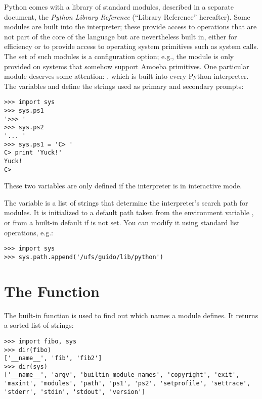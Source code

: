 \documentclass{manual}
\begin{document}
Python comes with a library of standard modules, described in a separate
document, the \emph{Python Library Reference} (``Library Reference''
hereafter).  Some modules are built into the interpreter; these
provide access to operations that are not part of the core of the
language but are nevertheless built in, either for efficiency or to
provide access to operating system primitives such as system calls.
The set of such modules is a configuration option; e.g., the
 module is  only provided on systems that somehow
support Amoeba primitives.  One particular module deserves some
attention: , which is built into every
Python interpreter.  The variables  and
 define the strings used as primary and secondary
prompts:

\begin{verbatim}
>>> import sys
>>> sys.ps1
'>>> '
>>> sys.ps2
'... '
>>> sys.ps1 = 'C> '
C> print 'Yuck!'
Yuck!
C> 
\end{verbatim}

These two variables are only defined if the interpreter is in
interactive mode.

The variable  is a list of strings that determine the
interpreter's search path for modules. It is initialized to a default
path taken from the environment variable , or from
a built-in default if  is not set.  You can modify
it using standard list operations, e.g.: 

\begin{verbatim}
>>> import sys
>>> sys.path.append('/ufs/guido/lib/python')
\end{verbatim}

\section{The  Function \label{dir}}

The built-in function  is used to find out which names
a module defines.  It returns a sorted list of strings:

\begin{verbatim}
>>> import fibo, sys
>>> dir(fibo)
['__name__', 'fib', 'fib2']
>>> dir(sys)
['__name__', 'argv', 'builtin_module_names', 'copyright', 'exit',
'maxint', 'modules', 'path', 'ps1', 'ps2', 'setprofile', 'settrace',
'stderr', 'stdin', 'stdout', 'version']
\end{verbatim}
\end{document}
